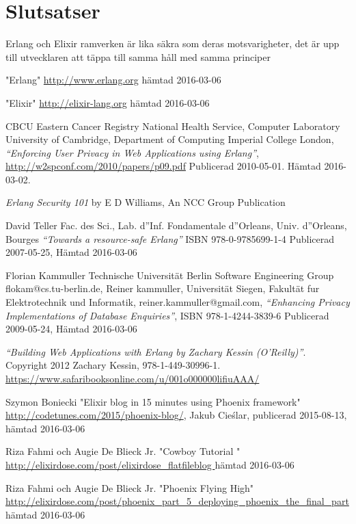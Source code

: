 \documentclass[12pt]{article}
\begin{document}
\section{Slutsatser}


Erlang och Elixir ramverken är lika säkra som deras motsvarigheter, det är upp till utvecklaren att täppa till samma håll med samma principer
	
\begin{thebibliography}{99}

	"Erlang" \url{http://www.erlang.org}
hämtad 2016-03-06

"Elixir" \url{http://elixir-lang.org}
hämtad 2016-03-06

 CBCU Eastern Cancer Registry National Health Service, Computer Laboratory University of Cambridge, Department of Computing Imperial College London, {\em “Enforcing User Privacy in Web Applications using Erlang”}, \url{http://w2spconf.com/2010/papers/p09.pdf} Publicerad 2010-05-01. Hämtad 2016-03-02.

 {\em Erlang Security 101} by E D Williams, An NCC Group Publication


David Teller Fac. des Sci., Lab. d''Inf. Fondamentale d''Orleans, Univ. d''Orleans, Bourges {\em “Towards a resource-safe Erlang”} ISBN 978-0-9785699-1-4 Publicerad 2007-05-25, Hämtad 2016-03-06			
					
Florian Kammuller Technische Universität Berlin Software Engineering Group flokam@cs.tu-berlin.de, Reiner kammuller, Universität Siegen, Fakultät fur Elektrotechnik und Informatik, reiner.kammuller@gmail.com, {\em “Enhancing Privacy Implementations of Database Enquiries”}, ISBN 978-1-4244-3839-6 Publicerad 2009-05-24, Hämtad 2016-03-06


 {\em “Building Web Applications with Erlang by Zachary Kessin (O’Reilly)”}. Copyright 2012 Zachary Kessin, 978-1-449-30996-1.
\url{https://www.safaribooksonline.com/u/001o000000lifiuAAA/}

 Szymon Boniecki "Elixir blog in 15 minutes using Phoenix framework" \url{http://codetunes.com/2015/phoenix-blog/}, Jakub Cieślar, publicerad 2015-08-13,
hämtad 2016-03-06

Riza Fahmi och Augie De Blieck Jr. "Cowboy Tutorial " \url{http://elixirdose.com/post/elixirdose_flatfileblog }
hämtad 2016-03-06

Riza Fahmi och Augie De Blieck Jr.  "Phoenix Flying High" \url{http://elixirdose.com/post/phoenix_part_5_deploying_phoenix_the_final_part} 
hämtad 2016-03-06


\end{thebibliography}
\end{document}
